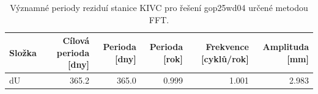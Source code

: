 \begin{table}[H]
\centering
\caption{Významné periody reziduí stanice KIVC pro řešení gop25wd04 určené metodou FFT.}
\label{tab:gop25wd04_stcd_kivc_detr_weighted_1seg_spectral_fft_significant_periods}
\begin{tabular}{lrrrrr}
\toprule
Složka & Cílová perioda [dny] & Perioda [dny] & Perioda [rok] & Frekvence [cyklů/rok] & Amplituda [mm] \\
\midrule
dU & 365.2 & 365.0 & 0.999 & 1.001 & 2.983 \\
\bottomrule
\end{tabular}
\end{table}
